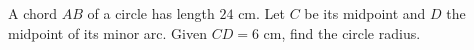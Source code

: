 A chord $AB$ of a circle has length $24$ cm. Let $C$ be its midpoint and $D$ the midpoint of its minor arc. Given $CD=6$ cm, find the circle radius.
